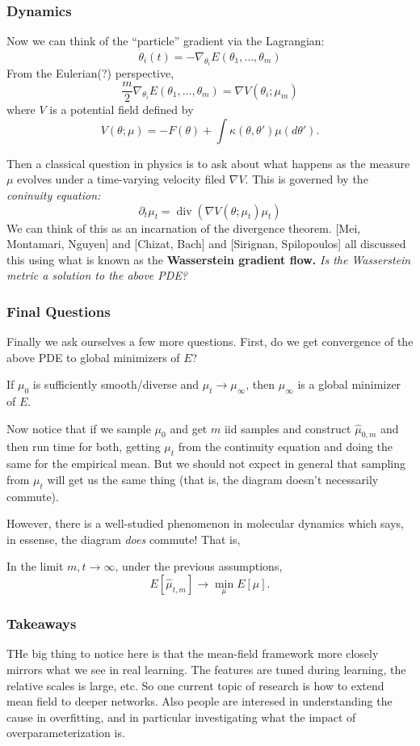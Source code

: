 \documentclass[12pt]{article}
\begin{document}
\subsubsection{Dynamics}
Now we can think of the ``particle'' gradient via the Lagrangian:
\[\dot\theta_i(t)=-\nabla_{\theta_i}E(\theta_1,\dots,\theta_m)\]
From the Eulerian(?) perspective, 
\[\frac{m}{2}\nabla_{\theta_i}E(\theta_1,\dots,\theta_m)=\nabla V(\theta_i;\mu_m)\]
where $V$ is a potential field defined by 
\[V(\theta;\mu)=-F(\theta)+\int\kappa(\theta,\theta')\mu(d\theta').\]

Then a classical question in physics is to ask about what happens as the measure $\mu$ evolves under a time-varying velocity filed $\nabla V$. This is governed by the \textit{coninuity equation:}
\[\partial_t\mu_t=\operatorname{div}(\nabla V(\theta;\mu_t)\mu_t)\]
We can think of this as an incarnation of the divergence theorem. [Mei, Montamari, Nguyen] and [Chizat, Bach] and [Sirignan, Spilopoulos] all discussed this using 
what is known as the \textbf{Wasserstein gradient flow.} \textit{Is the Wasserstein metric a solution to the above PDE?}

\subsubsection{Final Questions}
Finally we ask ourselves a few more questions. First, do we get convergence of the above PDE to global minimizers of $E$? 
\begin{thm}[CB, REVE]
	If $\mu_0$ is sufficiently smooth/diverse and $\mu_t\to \mu_\infty$, then $\mu_\infty$ is a global minimizer of $E$.
\end{thm}
Now notice that if we sample $\mu_0$ and get $m$ iid samples and construct $\hat\mu_{0,m}$ and then run time for both, getting $\mu_t$ from the continuity equation and doing the same for the empirical mean.
But we should not expect in general that sampling from $\mu_t$ will get us the same thing (that is, the diagram doesn't necessarily commute).

However, there is a well-studied phenomenon in molecular dynamics which says, in essense, the diagram \textit{does} commute! That is,
\begin{thm}[CB, MMN]
	In the limit $m,t\to\infty$, under the previous assumptions,
	\[E[\hat\mu_{t,m}]\to \min_{\mu}E[\mu].\]
\end{thm}

\subsubsection{Takeaways}
THe big thing to notice here is that the mean-field framework more closely mirrors what we see in real learning. The features are tuned during learning, the relative scales is large, etc.
So one current topic of research is how to extend mean field to deeper networks. Also people are interesed in understanding the cause in overfitting, and in particular investigating what the impact of overparameterization is.
\end{document}
